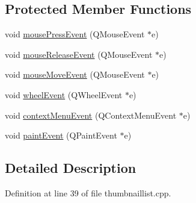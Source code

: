 \subsection*{Protected Member Functions}
\begin{DoxyCompactItemize}
\item 
void \hyperlink{classThumbnailListPrivate_aef27d3bb7e47b6c62f289ae9ee262088}{mouse\+Press\+Event} (Q\+Mouse\+Event $\ast$e)
\item 
void \hyperlink{classThumbnailListPrivate_adc500b95a5fea5c1aea32b53956d6c71}{mouse\+Release\+Event} (Q\+Mouse\+Event $\ast$e)
\item 
void \hyperlink{classThumbnailListPrivate_a56a4da562d0a5466034539758bd262fb}{mouse\+Move\+Event} (Q\+Mouse\+Event $\ast$e)
\item 
void \hyperlink{classThumbnailListPrivate_a3d0c57e89c2bd721dd90f14373afc1c0}{wheel\+Event} (Q\+Wheel\+Event $\ast$e)
\item 
void \hyperlink{classThumbnailListPrivate_ac330f0ad4cc6b2b8dd9a1d7ae926e810}{context\+Menu\+Event} (Q\+Context\+Menu\+Event $\ast$e)
\item 
void \hyperlink{classThumbnailListPrivate_a9c44f4b647793a84647a2efdf33d6ce3}{paint\+Event} (Q\+Paint\+Event $\ast$e)
\end{DoxyCompactItemize}


\subsection{Detailed Description}


Definition at line 39 of file thumbnaillist.\+cpp.



